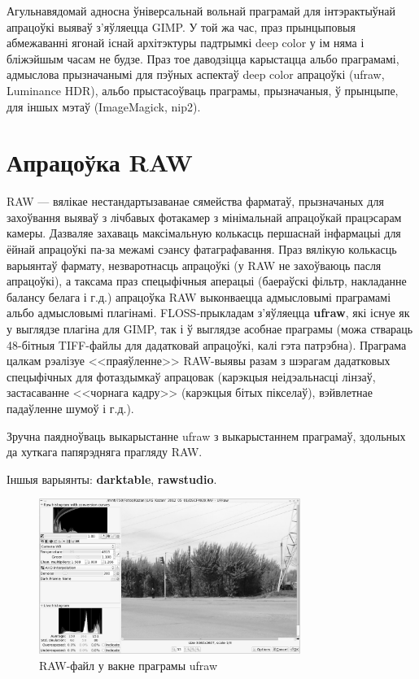 \documentclass[10pt, a5paper]{article}
\begin{document}
Агульнавядомай адносна ўніверсальнай вольнай праграмай для інтэрактыўнай апрацоўкі выяваў з'яўляецца GIMP. У той жа час, праз прынцыповыя абмежаванні ягонай існай архітэктуры падтрымкі deep color у ім няма і бліжэйшым часам не будзе. Праз тое даводзіцца карыстацца альбо праграмамі, адмыслова прызначанымі для пэўных аспектаў deep color апрацоўкі (ufraw, Luminance HDR), альбо прыстасоўваць праграмы, прызначаныя, ў прынцыпе, для іншых мэтаў (ImageMagick, nip2).

\section*{Апрацоўка RAW}

RAW --- вялікае нестандартызаванае сямейства фарматаў, прызначаных для захоўвання выяваў з лічбавых фотакамер з мінімальнай апрацоўкай працэсарам камеры. Дазваляе захаваць максімальную колькасць першаснай інфармацыі для ёйнай апрацоўкі па-за межамі сэансу фатаграфавання. Праз вялікую колькасць варыянтаў фармату, незваротнасць апрацоўкі (у RAW не захоўваюць пасля апрацоўкі), а таксама праз спецыфічныя аперацыі (баераўскі фільтр, накладанне балансу белага і г.д.) апрацоўка RAW выконваецца адмысловымі праграмамі альбо адмысловымі плагінамі. FLOSS-прыкладам з'яўляецца \textbf{ufraw}, які існуе як у выглядзе плагіна для GIMP, так і ў выглядзе асобнае праграмы (можа ствараць 48-бітныя TIFF-файлы для дадатковай апрацоўкі, калі гэта патрэбна). Праграма цалкам рэалізуе <<праяўленне>> RAW-выявы разам з шэрагам дадатковых спецыфічных для фотаздымкаў апрацовак (карэкцыя неідэальнасці лінзаў, застасаванне <<чорнага кадру>> (карэкцыя бітых пікселаў), вэйвлетнае падаўленне шумоў і г.д.).

Зручна паядноўваць выкарыстанне ufraw з выкарыстаннем праграмаў, здольных да хуткага папярэдняга прагляду RAW.

Іншыя варыянты: \textbf{darktable}, \textbf{rawstudio}.

\begin{figure}[htpb]
\centering
 \includegraphics[width=85mm]{LAS_LVEE_2012_RAW_gs.jpg}
 \caption{RAW-файл у вакне праграмы ufraw}
 \label{fig:RAW}
\end{figure}
\end{document}

